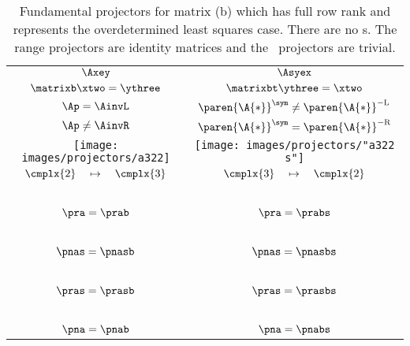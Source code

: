 \clearpage
\begin{table}[htdp]
\caption[Fundamental projectors for matrix (b)]{Fundamental projectors for matrix (b) which has full row rank and represents the overdetermined least squares case. There are no \ns s. The range projectors are identity matrices and the \ns \ projectors are trivial.}
\begin{center}
\begin{tabular}{cc}
%
  $\Axey$ & $\Asyex$\\
%
  $\matrixb  \xtwo   = \ythree$ &
  $\matrixbt \ythree = \xtwo$ \\[20pt]
%
$\Ap =   \AinvL$ & $\paren{\A{*}}^{\sym} \ne \paren{\A{*}}^{-\mathrm{L}} $ \\
$\Ap \ne \AinvR$ & $\paren{\A{*}}^{\sym} =   \paren{\A{*}}^{-\mathrm{R}} $ \\
%
\texttt{[image: images/projectors/a322]} &
\texttt{[image: images/projectors/"a322 s"]} \\
%
 $\cmplx{2} \quad \mapsto \quad \cmplx{3}$ & 
 $\cmplx{3} \quad \mapsto \quad \cmplx{2}$\\[5pt]\hline
\ \\
 $\pra  = \prab$  & $\pra  = \prabs$ \\
\ \\
 $\pnas = \pnasb$ & $\pnas = \pnasbs$ \\
\ \\
 $\pras = \prasb$ & $\pras = \prasbs$ \\
\ \\
 $\pna  = \pnab$  & $\pna  = \pnabs$
%
\end{tabular}
\end{center}
\label{tab:projector summary:b}
\end{table}

\endinput